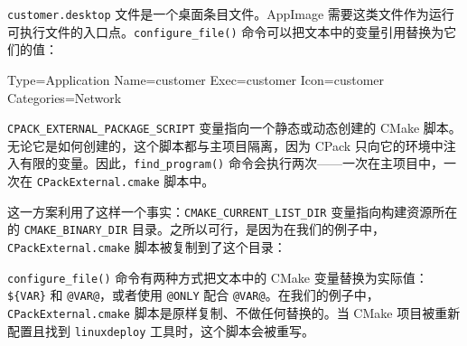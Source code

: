 \label{idx:715}
\label{idx:716}
\texttt{customer.\allowbreak{}desktop} 文件是一个桌面条目文件。AppImage 需要这类文件作为运行可执行文件的入口点。\texttt{configure\_\allowbreak{}file(\allowbreak{})\allowbreak{}} 命令可以把文本中的变量引用替换为它们的值：

\begin{codebox}
Type=Application
Name=customer
Exec=customer
Icon=customer
Categories=Network
\end{codebox}

\texttt{CPACK\_\allowbreak{}EXTERNAL\_\allowbreak{}PACKAGE\_\allowbreak{}SCRIPT} 变量指向一个静态或动态创建的 CMake 脚本。无论它是如何创建的，这个脚本都与主项目隔离，因为 CPack 只向它的环境中注入有限的变量。因此，\texttt{find\_\allowbreak{}program(\allowbreak{})\allowbreak{}} 命令会执行两次——一次在主项目中，一次在 \texttt{CPack\allowbreak{}External.\allowbreak{}cmake} 脚本中。

这一方案利用了这样一个事实：\texttt{CMAKE\_\allowbreak{}CURRENT\_\allowbreak{}LIST\_\allowbreak{}DIR} 变量指向构建资源所在的 \texttt{CMAKE\_\allowbreak{}BINARY\_\allowbreak{}DIR} 目录。之所以可行，是因为在我们的例子中，\texttt{CPack\allowbreak{}External.\allowbreak{}cmake} 脚本被复制到了这个目录：


\label{idx:717}
\label{idx:718}
\texttt{configure\_\allowbreak{}file(\allowbreak{})\allowbreak{}} 命令有两种方式把文本中的 CMake 变量替换为实际值：\texttt{\$\{VAR\}} 和 \texttt{@VAR@}，或者使用 \texttt{@ONLY} 配合 \texttt{@VAR@}。在我们的例子中，\texttt{CPack\allowbreak{}External.\allowbreak{}cmake} 脚本是原样复制、不做任何替换的。当 CMake 项目被重新配置且找到 \texttt{linuxdeploy} 工具时，这个脚本会被重写。

